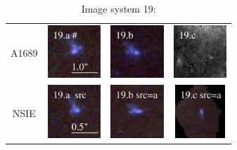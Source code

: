 \documentclass[useAMS,usenatbib]{mn2e}
\begin{document}
\begin{table}
  \caption{Image system 19:}\vspace{0mm}
  \begin{tabular}{cccc}
    \multicolumn{1}{m{1cm}}{{\Large A1689}}
    & \multicolumn{1}{m{1.7cm}}{\includegraphics[height=2.00cm,clip]{figs/nsie_img/rgb.img_19_a.ps}}
    & \multicolumn{1}{m{1.7cm}}{\includegraphics[height=2.00cm,clip]{figs/nsie_img/rgb.img_19_b.ps}}
    & \multicolumn{1}{m{1.7cm}}{\includegraphics[height=2.00cm,clip]{figs/nsie_img/eF775outac_sub.img_19_c.ps}}\\
    \multicolumn{1}{m{1cm}}{{\Large NSIE}}
    & \multicolumn{1}{m{1.7cm}}{\includegraphics[height=2.00cm,clip]{figs/nsie_img/rgb.src_19_a.ps}}
    & \multicolumn{1}{m{1.7cm}}{\includegraphics[height=2.00cm,clip]{figs/nsie_img/rgb.pre_19_b_a_tri.ps}}
    & \multicolumn{1}{m{1.7cm}}{\includegraphics[height=2.00cm,clip]{figs/nsie_img/rgb.pre_19_c_a_tri.ps}} \\

\end{tabular}
\end{table}
\end{document}

